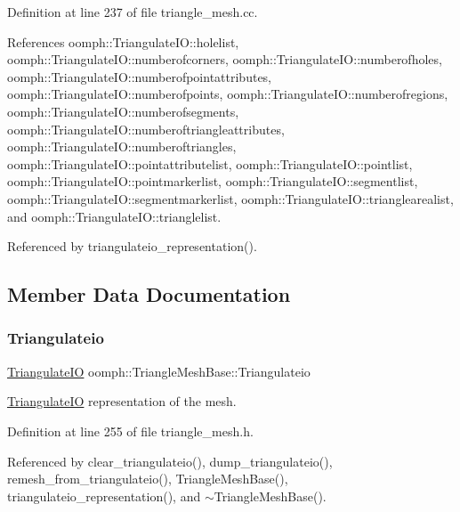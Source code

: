 Definition at line 237 of file triangle\+\_\+mesh.\+cc.



References oomph\+::\+Triangulate\+I\+O\+::holelist, oomph\+::\+Triangulate\+I\+O\+::numberofcorners, oomph\+::\+Triangulate\+I\+O\+::numberofholes, oomph\+::\+Triangulate\+I\+O\+::numberofpointattributes, oomph\+::\+Triangulate\+I\+O\+::numberofpoints, oomph\+::\+Triangulate\+I\+O\+::numberofregions, oomph\+::\+Triangulate\+I\+O\+::numberofsegments, oomph\+::\+Triangulate\+I\+O\+::numberoftriangleattributes, oomph\+::\+Triangulate\+I\+O\+::numberoftriangles, oomph\+::\+Triangulate\+I\+O\+::pointattributelist, oomph\+::\+Triangulate\+I\+O\+::pointlist, oomph\+::\+Triangulate\+I\+O\+::pointmarkerlist, oomph\+::\+Triangulate\+I\+O\+::segmentlist, oomph\+::\+Triangulate\+I\+O\+::segmentmarkerlist, oomph\+::\+Triangulate\+I\+O\+::trianglearealist, and oomph\+::\+Triangulate\+I\+O\+::trianglelist.



Referenced by triangulateio\+\_\+representation().



\subsection{Member Data Documentation}
\mbox{\label{classoomph_1_1TriangleMeshBase_a488453de96eadbe320ea97c63a34d748}} 
\subsubsection{\texorpdfstring{Triangulateio}{Triangulateio}}
{\footnotesize\ttfamily \hyperlink{structoomph_1_1TriangulateIO}{Triangulate\+IO} oomph\+::\+Triangle\+Mesh\+Base\+::\+Triangulateio\hspace{0.3cm}{\ttfamily [protected]}}



\hyperlink{structoomph_1_1TriangulateIO}{Triangulate\+IO} representation of the mesh. 



Definition at line 255 of file triangle\+\_\+mesh.\+h.



Referenced by clear\+\_\+triangulateio(), dump\+\_\+triangulateio(), remesh\+\_\+from\+\_\+triangulateio(), Triangle\+Mesh\+Base(), triangulateio\+\_\+representation(), and $\sim$\+Triangle\+Mesh\+Base().

